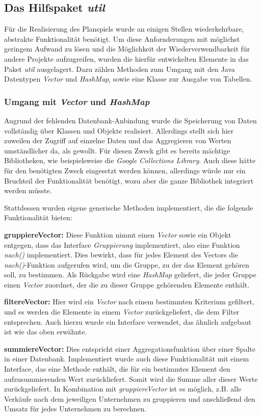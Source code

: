 \subsection{Das Hilfspaket \textit{util}}
\label{sub:fachkonzept-implementierung-util}

Für die Realisierung des Planspiels wurde an einigen Stellen wiederkehrbare, abstrakte Funktionalität benötigt. Um diese Anfornderungen mit möglichst geringem Aufwand zu lösen und die Möglichkeit der Wiederverwendbarkeit für andere Projekte aufzugreifen, wurden die hierfür entwickelten Elemente in das Paket \textit{util} ausgelagert. Dazu zählen Methoden zum Umgang mit den Java Datentypen \textit{Vector} und \textit{HashMap}, sowie eine Klasse zur Ausgabe von Tabellen.

\subsubsection{Umgang mit \textit{Vector} und \textit{HashMap}}
Augrund der fehlenden Datenbank-Anbindung wurde die Speicherung von Daten vollständig über Klassen und Objekte realisiert. Allerdings stellt sich hier zuweilen der Zugriff auf einzelne Daten und das Aggregieren von Werten umständlicher da, als gewollt. Für diesen Zweck gibt es bereits mächtige Bibliotheken, wie beispielsweise die \textit{Google Collections Library}. Auch diese hätte für den benötigten Zweck eingesetzt werden können, allerdings würde nur ein Bruchteil der Funktionalität benötigt, wozu aber die ganze Bibliothek integriert werden müsste.

Stattdessen wurden eigene generische Methoden implementiert, die die folgende Funktionalität bieten:

\begin{seList}
\item \textbf{gruppiereVector:} Diese Funktion nimmt einen \textit{Vector} sowie ein Objekt entgegen, dass das Interface \textit{Gruppierung} implementiert, also eine Funktion \textit{nach()} implementiert. Dies bewirkt, dass für jedes Element des Vectors die \textit{nach()}-Funktion aufgerufen wird, um die Gruppe, zu der das Element gehören soll, zu bestimmen. Als Rückgabe wird eine \textit{HashMap} geliefert, die jeder Gruppe einen \textit{Vector} zuordnet, der die zu dieser Gruppe gehörenden Elemente enthält.
\item \textbf{filtereVector:} Hier wird ein \textit{Vector} nach einem bestimmten Kriterium gefiltert, und es werden die Elemente in einem \textit{Vector} zurückgeliefert, die dem Filter entsprechen. Auch hierzu wurde ein Interface verwendet, das ähnlich aufgebaut ist wie das oben erwähnte.
\item \textbf{summiereVector:} Dies entspricht einer Aggregationsfunktion über einer Spalte in einer Datenbank. Implementiert wurde auch diese Funktionalität mit einem Interface, das eine Methode enthält, die für ein bestimmtes Element den aufzusummierenden Wert zurückliefert. Somit wird die Summe aller dieser Werte zurückgeliefert. In Kombination mit \textit{gruppiereVector} ist es möglich, z.B. alle Verkäufe nach dem jeweiligen Unternehmen zu gruppieren und anschließend den Umsatz für jedes Unternehmen zu berechnen.
\end{seList}


